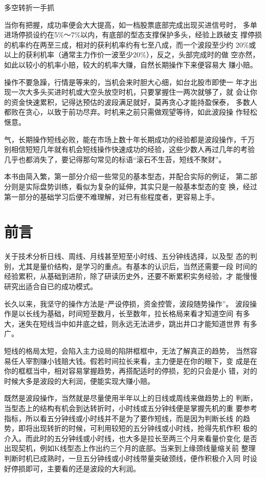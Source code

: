 \documentclass{article}
\begin{document}
\clearpage

多空转折一手抓

当你有把握，成功率便会大大提高，如一档股票底部完成出现买进信号时， 多单进场停损设约在5\%～7\%以内，有底部的型态支撑保护多头，经验上跌破支 撑停损的机率约在两至三成，相对的获利机率约有七至八成，而一个波段至少约 20\%或以上的获利机率（通常主力作价一波至少20\%），反之，头部完成时的做 空亦然，如此以较小的机率小赔，较大的机率大赚，自然长期操作下来便容易大 赚小赔。

操作不要急躁，行情是等来的，当机会来时胆大心细，如台北股市即使一 年才出现一次大多头买进时机或大空头放空时机，只要掌握住一两次就够了，就 会让你的资金快速累积，记得达预估的波段满足就好，莫再贪心才能持盈保泰， 多数人都败在贪心，以致于前功尽弃。时机来之前只需做观望等待，如此波段操 作轻松惬意。

气，长期操作短线必败，能在市场上数十年长期成功的经验都是波段操作，千万 别相信短短几年就有机会短线操作快速成功的经验，这些少数人再过几年的考验 几乎也都消失了，要记得那句常见的标语“滚石不生苔，短线不聚财”。

本书由简入繁，第一部分介绍一些常见的基本型态，并配合实际的例证， 第二部分则是实际盘势训练，看似为复杂的延伸，其实只是一般基本型态的变 换，经过第一部分的基础学习后便不难理解，对已有些程度者，更容易上手。

\clearpage

\section{前言}

关于技术分析日线、周线、月线甚至短至小时线、五分钟线选择，以及型 态的判别，尤其是量价结构，是学习的重点。有基本的认识后，当然还需要一段 时间的经验累积，从基础到进阶，除了研读历史外，还要不断累积实务经验，才 能慢慢研究出适合自已的成功模式。

长久以来，我坚守的操作方法是“严设停损，资金控管，波段随势操作”。 波段操作是以长线为基础，时间短至数月，长至数年，拉长格局来看才知道空间 有多大，迷失在短线当中如井底之蛙，则永远无法进步，跳出井口才能知道世界 有多广。

短线的格局太短，会陷入主力设局的陷阱框框中，无法了解真正的趋势， 当然容易任人宰割赚小钱赔大钱。假若时间拉长来看，主力便是在你的眼下，变 成是在你的框框当中，相对容易掌握趋势，再搭配适时的停损，犯的只会是小 错，对的时候大多是波段的大利润，便能实现大赚小赔。

既然是波段操作，当然就是尽量使用半年以上的日线或周线来做趋势上的 判断，当型态上的结构有机会到达转折时，小时线或五分钟线便是掌握先机的重 要参考指标，所以看五分钟线或小时线并不是为了要作短线，而是因为判断长线 的趋势，即将出现转折的时候，可利用较短的五分钟线或小时线，抢得先机作积 极的介入。而此时的五分钟线或小时线，也大多是拉长至两三个月来看量价变化 是否出现契机，例如K线型态上作出约三个月的底部。当来到上缘颈线量缩关前 整理判断时机已成熟时，一旦五分钟线或小时线带量突破颈线，便作积极介入同 时设好停损即可，主要看的还是波段的大利润。
\end{document}
